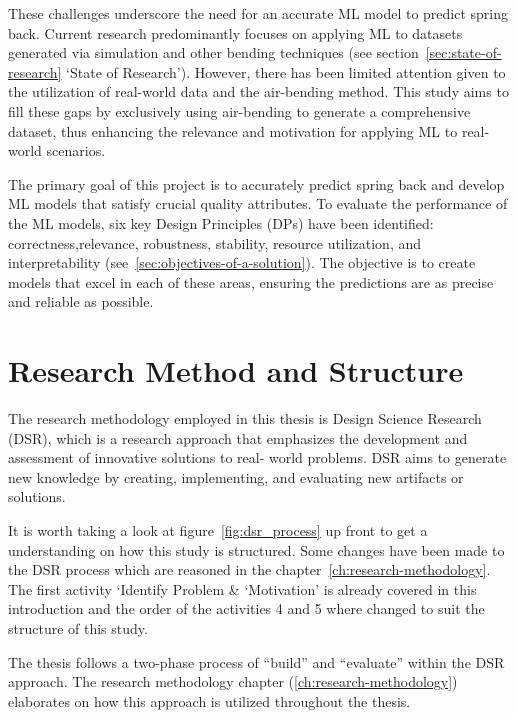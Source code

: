 These challenges underscore the need for an accurate ML model to predict spring back.
Current research predominantly focuses on applying ML to datasets generated via simulation and other bending
techniques (see section~\ref{sec:state-of-research} `State of Research').
However, there has been limited attention given to the utilization of real-world data and the air-bending method.
This study aims to fill these gaps by exclusively using air-bending to generate a comprehensive dataset, thus
enhancing the relevance and motivation for applying ML to real-world scenarios.

The primary goal of this project is to accurately predict spring back and develop \ac{ML} models that satisfy crucial
quality attributes.
To evaluate the performance of the ML models, six key Design Principles (DPs) have been identified:
correctness,relevance, robustness, stability, resource utilization, and interpretability
(see~\ref{sec:objectives-of-a-solution}).
The objective is to create models that excel in each of these areas, ensuring the predictions are as precise and
reliable as possible.

\section{Research Method and Structure}\label{sec:research-method-and-structure}
The research methodology employed in this thesis is Design Science Research (DSR), which is a
research approach that emphasizes the development and assessment of innovative solutions to real-
world problems.
DSR aims to generate new knowledge by creating, implementing, and evaluating new artifacts or
solutions.

It is worth taking a look at figure~\ref{fig:dsr_process} up front to get a understanding on how this study is
structured.
Some changes have been made to the DSR process which are reasoned in the chapter~\ref{ch:research-methodology}.
The first activity `Identify Problem \& `Motivation' is already covered in this introduction and the order of the
activities 4 and 5 where changed to suit the structure of this study.

The thesis follows a two-phase process of ``build'' and ``evaluate'' within the DSR approach.
The research methodology chapter (\ref{ch:research-methodology}) elaborates on how this approach is
utilized throughout the thesis.


